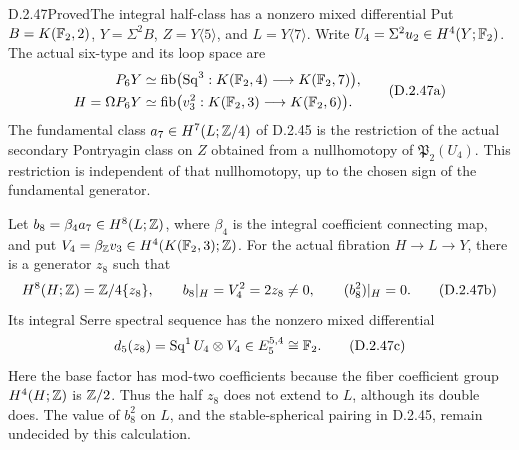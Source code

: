 \begin{claim}{D.2.47}{Proved}{The integral half-class has a nonzero mixed differential}
Put $B=K(\mathbb F_2,2)$, $Y=\Sigma^2B$, $Z=Y\langle5\rangle$,
and $L=Y\langle7\rangle$. Write $U_4=\Sigma^2u_2\in H^4(Y;\mathbb F_2)$.
The actual six-type and its loop space are
\[
\begin{aligned}
 P_6Y&\simeq\operatorname{fib}\bigl(\operatorname{Sq}^3:
       K(\mathbb F_2,4)\longrightarrow K(\mathbb F_2,7)\bigr),
 \\
 H=\Omega P_6Y&\simeq\operatorname{fib}\bigl(v_3^2:
       K(\mathbb F_2,3)\longrightarrow K(\mathbb F_2,6)\bigr).
\end{aligned}
 \tag{D.2.47a}
\]
The fundamental class $a_7\in H^7(L;\mathbb Z/4)$ of D.2.45 is the
restriction of the actual secondary Pontryagin class on $Z$
obtained from a nullhomotopy of $\mathfrak P_2(U_4)$.
This restriction is independent of that nullhomotopy, up to the
chosen sign of the fundamental generator.

Let $b_8=\beta_4a_7\in H^8(L;\mathbb Z)$, where $\beta_4$ is the
integral coefficient connecting map, and put
$V_4=\beta_{\mathbb Z}v_3\in H^4(K(\mathbb F_2,3);\mathbb Z)$.
For the actual fibration $H\longrightarrow L\longrightarrow Y$,
there is a generator $z_8$ such that
\[
 H^8(H;\mathbb Z)=\mathbb Z/4\{z_8\},\qquad
 b_8|_H=V_4^2=2z_8\ne0,\qquad
 (b_8^2)|_H=0.
 \tag{D.2.47b}
\]
Its integral Serre spectral sequence has the nonzero mixed
differential
\[
 d_5(z_8)=\operatorname{Sq}^1U_4\otimes V_4
       \in E_5^{5,4}\cong\mathbb F_2.
 \tag{D.2.47c}
\]
Here the base factor has mod-two coefficients because the
fiber coefficient group $H^4(H;\mathbb Z)$ is $\mathbb Z/2$.
Thus the half $z_8$ does not extend to $L$, although its
double does. The value of $b_8^2$ on $L$, and the stable-spherical
pairing in D.2.45, remain undecided by this calculation.
\end{claim}
